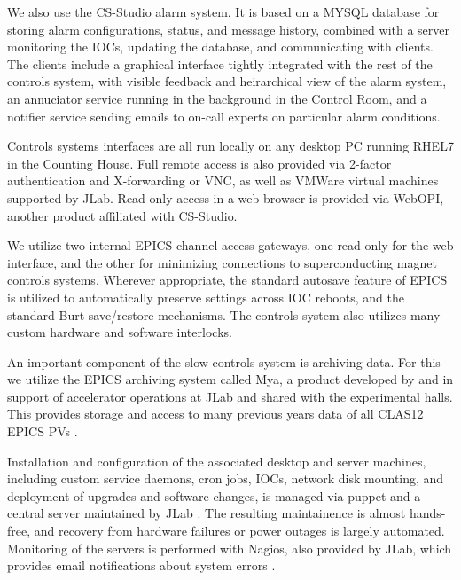 We also use the CS-Studio alarm system.  It is based on a MYSQL database for storing alarm configurations, status, and message history, combined with a server monitoring the IOCs, updating the database, and communicating with clients.  The clients include a graphical interface tightly integrated with the rest of the controls system, with visible feedback and heirarchical view of the alarm system, an annuciator service running in the background in the Control Room, and a notifier service sending emails to on-call experts on particular alarm conditions.

Controls systems interfaces are all run locally on any desktop PC running RHEL7 in the Counting House.  Full remote access is also provided via 2-factor authentication and X-forwarding or VNC, as well as VMWare virtual machines supported by JLab.  Read-only access in a web browser is provided via WebOPI, another product affiliated with CS-Studio.

We utilize two internal EPICS channel access gateways, one read-only for the web interface, and the other for minimizing connections to superconducting magnet controls systems.  Wherever appropriate, the standard autosave feature of EPICS is utilized to automatically preserve settings across IOC reboots, and the standard Burt save/restore mechanisms.  The controls system also utilizes many custom hardware and software interlocks.

An important component of the slow controls system is archiving data.  For this we utilize the EPICS archiving system called Mya, a product developed by and in support of accelerator operations at JLab and shared with the experimental halls.  This provides storage and access to many previous years data of all CLAS12 EPICS PVs \cite{mya}.

Installation and configuration of the associated desktop and server machines, including custom service daemons, cron jobs, IOCs, network disk mounting, and deployment of upgrades and software changes, is managed via puppet and a central server maintained by JLab \cite{puppet-website}. The resulting maintainence is almost hands-free, and recovery from hardware failures or power outages is largely automated.  Monitoring of the servers is performed with Nagios, also provided by JLab, which provides email notifications about system errors \cite{nagios-website}.

